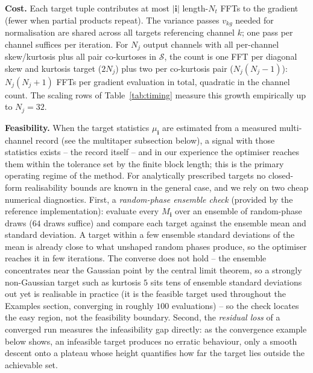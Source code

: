 \documentclass[10pt,a4paper]{article}
\numberwithin{equation}{section}
\newcommand{\mat}[1]{\left(#1\right)}
\begin{document}
\textbf{Cost.} Each target tuple contributes at most $|\mathbf{i}|$ length-$N_t$ FFTs to the gradient (fewer when partial products repeat). The variance passes $v_{k g}$ needed for normalisation are shared across all targets referencing channel $k$; one pass per channel suffices per iteration. For $N_j$ output channels with all per-channel skew/kurtosis plus all pair co-kurtoses in $\mathcal{S}$, the count is one FFT per diagonal skew and kurtosis target ($2 N_j$) plus two per co-kurtosis pair ($N_j\mat{N_j-1}$): $N_j\mat{N_j+1}$ FFTs per gradient evaluation in total, quadratic in the channel count. The scaling rows of Table~\ref{tab:timing} measure this growth empirically up to $N_j = 32$.

\textbf{Feasibility.} When the target statistics $\mu_\mathbf{i}$ are estimated from a measured multi-channel record (see the multitaper subsection below), a signal with those statistics exists -- the record itself -- and in our experience the optimiser reaches them within the tolerance set by the finite block length; this is the primary operating regime of the method. For analytically prescribed targets no closed-form realisability bounds are known in the general case, and we rely on two cheap numerical diagnostics. First, a \emph{random-phase ensemble check} (provided by the reference implementation): evaluate every $M_\mathbf{i}$ over an ensemble of random-phase draws ($64$ draws suffice) and compare each target against the ensemble mean and standard deviation. A target within a few ensemble standard deviations of the mean is already close to what unshaped random phases produce, so the optimiser reaches it in few iterations. The converse does not hold -- the ensemble concentrates near the Gaussian point by the central limit theorem, so a strongly non-Gaussian target such as kurtosis $5$ sits tens of ensemble standard deviations out yet is realisable in practice (it is the feasible target used throughout the Examples section, converging in roughly $100$ evaluations) -- so the check locates the easy region, not the feasibility boundary. Second, the \emph{residual loss} of a converged run measures the infeasibility gap directly: as the convergence example below shows, an infeasible target produces no erratic behaviour, only a smooth descent onto a plateau whose height quantifies how far the target lies outside the achievable set.
\end{document}
